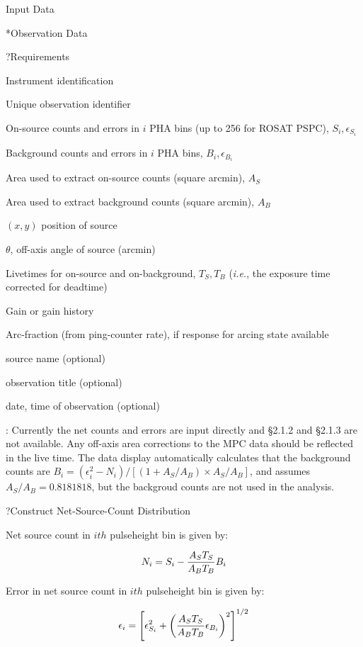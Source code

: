 \@{Input Data}

\**Observation Data

\??Requirements

{\listlist
Instrument identification

Unique observation identifier

On-source counts and errors in $i$ PHA bins (up to 256 for ROSAT
PSPC), $S_i, \epsilon_{S_i}$

Background counts and errors in $i$ PHA bins, $B_i, \epsilon_{B_i}$

Area used to extract on-source counts (square arcmin), $A_S$

Area used to extract background counts (square arcmin), $A_B$

$(x,y)$ position of source

$\theta$, off-axis angle of source (arcmin)

Livetimes for on-source and on-background, $T_S, T_B$ ({\it i.e.}, the
exposure time corrected for deadtime)

Gain or gain history

Arc-fraction (from ping-counter rate), if response for arcing state available

source name (optional)

observation title (optional)

date, time of observation (optional)

: Currently the net counts and errors are input
directly and \S 2.1.2 and \S 2.1.3 are not available. Any off-axis
area corrections to the MPC data should be reflected in the live time.
The data display automatically calculates that the background counts
are $B_i = (\epsilon_i^2 - N_i) / [ ( 1 + A_S/A_B) \times A_S/A_B]$,
and assumes $A_S/A_B = 0.8181818$, but the backgroud counts are not
used in the analysis.

}

\??Construct Net-Source-Count Distribution

{\listlist

Net source count in $ith$ pulseheight bin is given by:

}

$$N_i = S_i - {A_S T_S \over A_B T_B} B_i$$

{\listlist

Error in net source count in $ith$ pulseheight bin is given by:

}

$$\epsilon_i = \left[ \epsilon_{S_i}^2 + 
\left({A_S T_S \over A_B T_B} \epsilon_{B_i} \right)^2
\right]^{1/2}$$

